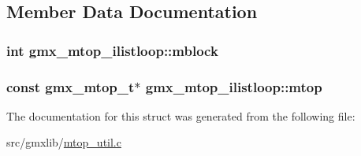 \subsection{\-Member \-Data \-Documentation}
\hypertarget{structgmx__mtop__ilistloop_a1df120c79bb4107075b5d26e6f4a9fd8}{
\subsubsection[{mblock}]{\setlength{\rightskip}{0pt plus 5cm}int {\bf gmx\-\_\-mtop\-\_\-ilistloop\-::mblock}}}\label{structgmx__mtop__ilistloop_a1df120c79bb4107075b5d26e6f4a9fd8}
\hypertarget{structgmx__mtop__ilistloop_a09750a3a7e337291054a3e5909d1b27e}{
\subsubsection[{mtop}]{\setlength{\rightskip}{0pt plus 5cm}const {\bf gmx\-\_\-mtop\-\_\-t}$\ast$ {\bf gmx\-\_\-mtop\-\_\-ilistloop\-::mtop}}}\label{structgmx__mtop__ilistloop_a09750a3a7e337291054a3e5909d1b27e}


\-The documentation for this struct was generated from the following file\-:\begin{DoxyCompactItemize}
\item 
src/gmxlib/\hyperlink{mtop__util_8c}{mtop\-\_\-util.\-c}\end{DoxyCompactItemize}
